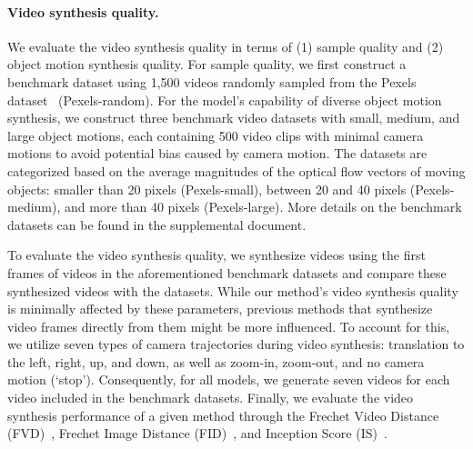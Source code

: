 \vspace{-3mm}
\paragraph{Video synthesis quality.}
We evaluate the video synthesis quality in terms of (1) sample quality and (2) object motion synthesis quality.
For sample quality, we first construct a benchmark dataset using 1,500 videos randomly sampled from the Pexels dataset~\cite{pexels_dataset} (Pexels-random).
For the model's capability of diverse object motion synthesis, we construct three benchmark video datasets with small, medium, and large object motions, each containing 500 video clips with minimal camera motions to avoid potential bias caused by camera motion.
The datasets are categorized based on the average magnitudes of the optical flow vectors of moving objects: smaller than 20 pixels (Pexels-small), between 20 and 40 pixels (Pexels-medium), and more than 40 pixels (Pexels-large).
More details on the benchmark datasets can be found in the supplemental document.


To evaluate the video synthesis quality, we synthesize videos using the first frames of videos in the aforementioned  benchmark datasets and compare these synthesized videos with the datasets.
While our method's video synthesis quality is minimally affected by these parameters, previous methods that synthesize video frames directly from them might be more influenced. 
To account for this, we utilize seven types of camera trajectories during video synthesis: translation to the left, right, up, and down, as well as zoom-in, zoom-out, and no camera motion (`stop').
Consequently, for all models, we generate seven videos for each video included in the benchmark datasets.
Finally, we evaluate the video synthesis performance of a given method through the Frechet Video Distance (FVD)~\cite{unterthiner2018towards}, Frechet Image Distance (FID)~\cite{heusel2017gans}, and Inception Score (IS)~\cite{salimans2016improved}.




